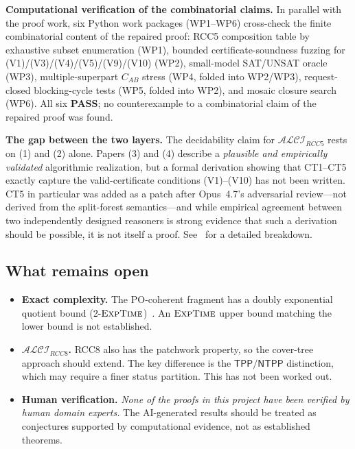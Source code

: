 \documentclass[
]{ceurart}
\theoremstyle{definition}
\newcommand{\ALCIRCC}[1]{\ensuremath{\mathcal{ALCI}_{\mathit{RCC#1}}}}
\newcommand{\TPP}{\ensuremath{\mathsf{TPP}}}
\newcommand{\NTPP}{\ensuremath{\mathsf{NTPP}}}
\newcommand{\EXPTIME}{\textsc{ExpTime}}
\begin{document}
\medskip\noindent\textbf{Computational verification of the
combinatorial claims.}  In parallel with the proof work, six
Python work packages (WP1--WP6) cross-check the finite
combinatorial content of the repaired proof:  RCC5 composition
table by exhaustive subset enumeration (WP1), bounded
certificate-soundness fuzzing for (V1)/(V3)/(V4)/(V5)/(V9)/(V10)
(WP2), small-model SAT/UNSAT oracle (WP3), multiple-superpart
$C_{AB}$ stress (WP4, folded into WP2/WP3), request-closed
blocking-cycle tests (WP5, folded into WP2), and mosaic closure
search (WP6).  All six \textbf{PASS}; no counterexample to a
combinatorial claim of the repaired proof was found.

\medskip\noindent\textbf{The gap between the two layers.}
The decidability claim for $\ALCIRCC{5}$ rests on (1) and (2)
alone.  Papers (3) and (4) describe a \emph{plausible and
empirically validated} algorithmic realization, but a formal
derivation showing that CT1--CT5 exactly capture the
valid-certificate conditions (V1)--(V10) has not been written.
CT5 in particular was added as a patch after Opus~4.7's
adversarial review---not derived from the split-forest
semantics---and while empirical agreement between two
independently designed reasoners is strong evidence that such a
derivation should be possible, it is not itself a proof.
See~\cite[\S7]{CoverTreeImpl} for a detailed breakdown.

\subsection{What remains open}

\begin{itemize}
  \item \textbf{Exact complexity.}  The PO-coherent fragment has a
    doubly exponential quotient bound
    (2-$\EXPTIME$)~\cite{TwoTierQuotient}.  An $\EXPTIME$ upper
    bound matching the lower bound is not established.

  \item \textbf{$\ALCIRCC{8}$.}  RCC8 also has the patchwork
    property, so the cover-tree approach should extend.  The key
    difference is the $\TPP/\NTPP$ distinction, which may require
    a finer status partition.  This has not been worked out.

  \item \textbf{Human verification.}  \emph{None of the proofs in
    this project have been verified by human domain experts.}  The
    AI-generated results should be treated as conjectures supported
    by computational evidence, not as established theorems.
\end{itemize}
\end{document}
